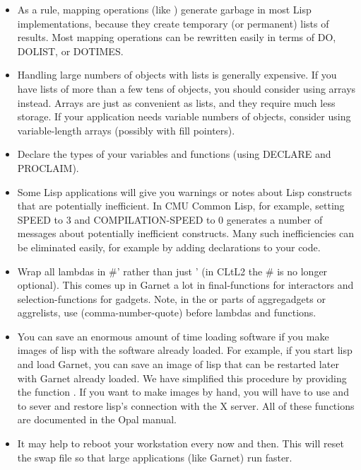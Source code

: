 \begin{itemize}
\item As a rule, mapping operations (like ) generate garbage in most Lisp
implementations, because they create temporary (or permanent) lists of
results.  Most mapping operations can be rewritten easily in terms of
DO, DOLIST, or DOTIMES.

\item Handling large numbers of objects with lists is generally expensive.
If you have lists of more than a few tens of objects, you should
consider using arrays instead.  Arrays are just as convenient as lists,
and they require much less storage.  If your application needs
variable numbers of objects, consider using variable-length arrays
(possibly with fill pointers).

\item Declare the types of your variables and functions (using DECLARE and
PROCLAIM).

\item Some Lisp applications will give you warnings or notes about Lisp
constructs that are potentially inefficient.  In CMU Common Lisp, for
example, setting SPEED to 3 and COMPILATION-SPEED to 0 generates a
number of messages about potentially inefficient constructs.  Many
such inefficiencies can be eliminated easily, for example by adding
declarations to your code.

\item Wrap all lambdas in \#' rather than just ' (in CLtL2 the \# is no longer
optional).  This
comes up in Garnet a lot in final-functions for interactors and
selection-functions for gadgets.  Note, in the  or
 parts of aggregadgets or aggrelists, use 
(comma-number-quote) before lambdas and functions.

\item You can save an enormous amount of time loading software if you make images
of lisp with the software already loaded.  For example, if you start lisp and
load Garnet, you can save an image of lisp that can be restarted later with
Garnet already loaded.  We have simplified this procedure by providing the
function .  If you want to make images by hand, you will
have to use  and 
to sever and restore lisp's connection with the X server.  All of these
functions are documented in the Opal manual.

\item It may help to reboot your workstation every now and then.  This will reset
the swap file so that large applications (like Garnet) run faster.
\end{itemize}



